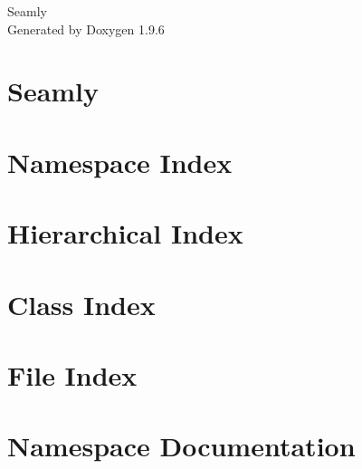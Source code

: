 \documentclass[twoside]{book}
\newcommand{\+}{\discretionary{\mbox{\scriptsize$\hookleftarrow$}}{}{}}
\newcommand{\clearemptydoublepage}{%
    \newpage{\pagestyle{empty}\cleardoublepage}%
  }
\begin{document}
  \raggedbottom
    \hypersetup{pageanchor=false,
                bookmarksnumbered=true,
                pdfencoding=unicode
               }
  \begin{titlepage}
  \vspace*{7cm}
  \begin{center}%
  {\Large Seamly}\\
  \vspace*{1cm}
  {\large Generated by Doxygen 1.9.6}\\
  \end{center}
  \end{titlepage}
  \clearemptydoublepage
  \tableofcontents
  \clearemptydoublepage
  \hypersetup{pageanchor=true}
\chapter{Seamly}
\label{index}\hypertarget{index}{}
\chapter{Namespace Index}

\chapter{Hierarchical Index}

\chapter{Class Index}

\chapter{File Index}

\chapter{Namespace Documentation}







\end{document}
